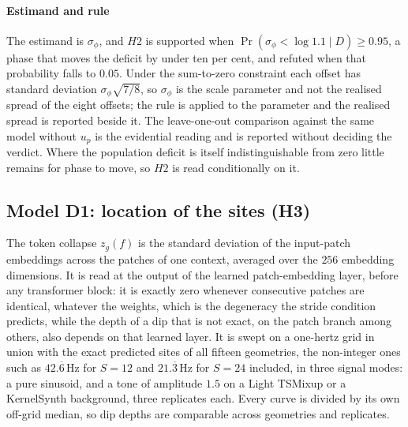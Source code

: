 \paragraph{Estimand and rule} The estimand is $\sigma_\phi$, and $H2$ is supported when $\Pr(\sigma_\phi<\log1.1\mid D)\ge0.95$, a phase that moves the deficit by under ten per cent, and refuted when that probability falls to $0.05$. Under the sum-to-zero constraint each offset has standard deviation $\sigma_\phi\sqrt{7/8}$, so $\sigma_\phi$ is the scale parameter and not the realised spread of the eight offsets; the rule is applied to the parameter and the realised spread is reported beside it. The leave-one-out comparison against the same model without $u_p$ is the evidential reading and is reported without deciding the verdict. Where the population deficit is itself indistinguishable from zero little remains for phase to move, so $H2$ is read conditionally on it.

\subsection{Model D1: location of the sites (H3)}

The token collapse $z_g(f)$ is the standard deviation of the input-patch embeddings across the patches of one context, averaged over the $256$ embedding dimensions. It is read at the output of the learned patch-embedding layer, before any transformer block: it is exactly zero whenever consecutive patches are identical, whatever the weights, which is the degeneracy the stride condition predicts, while the depth of a dip that is not exact, on the patch branch among others, also depends on that learned layer. It is swept on a one-hertz grid in union with the exact predicted sites of all fifteen geometries, the non-integer ones such as $42.\overline{6}$\,Hz for $S=12$ and $21.\overline{3}$\,Hz for $S=24$ included, in three signal modes: a pure sinusoid, and a tone of amplitude $1.5$ on a Light TSMixup or a KernelSynth background, three replicates each. Every curve is divided by its own off-grid median, so dip depths are comparable across geometries and replicates.

